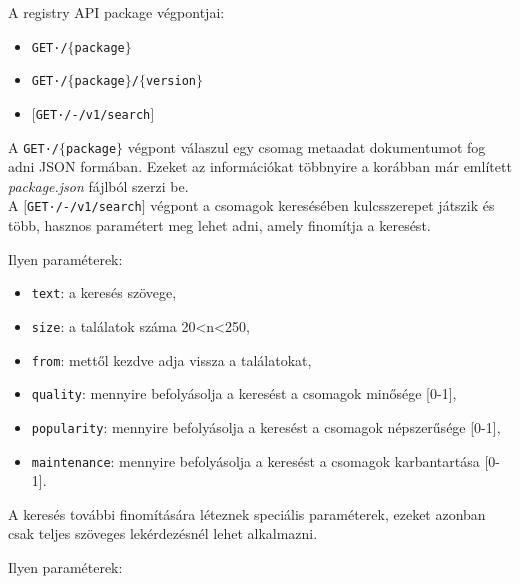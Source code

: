 \noindent A registry API package végpontjai:

\begin{itemize}
	\item \texttt{GET·/$\bigl\{$package$\bigr\}$}
	\item \texttt{GET·/$\bigl\{$package$\bigr\}$/$\bigl\{$version$\bigr\}$}
	\item \texttt{$\big[$GET·/-/v1/search$\big]$}
\end{itemize}

A \texttt{GET·/$\bigl\{$package$\bigr\}$} végpont válaszul egy csomag metaadat dokumentumot fog adni JSON formában. Ezeket az információkat többnyire a korábban már említett \emph{package.json} fájlból szerzi be.\\

A \texttt{$\big[$GET·/-/v1/search$\big]$} végpont a csomagok keresésében kulcsszerepet játszik és több, hasznos paramétert meg lehet adni, amely finomítja a keresést.

Ilyen paraméterek:

\begin{itemize}
	\item \texttt{text}: a keresés szövege,
	\item \texttt{size}: a találatok száma 20<n<250,
	\item \texttt{from}: mettől kezdve adja vissza a találatokat,
	\item \texttt{quality}: mennyire befolyásolja a keresést a csomagok minősége [0-1],
	\item \texttt{popularity}: mennyire befolyásolja a keresést a csomagok népszerűsége [0-1],
	\item \texttt{maintenance}: mennyire befolyásolja a keresést a csomagok karbantartása [0-1].
\end{itemize}

\pagebreak

A keresés további finomítására léteznek speciális paraméterek, ezeket azonban csak teljes szöveges lekérdezésnél lehet alkalmazni.

Ilyen paraméterek:

